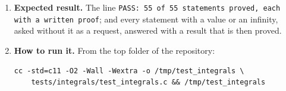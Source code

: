 \documentclass[11pt,a4paper]{article}
\begin{document}
\begin{enumerate}
\item \textbf{Expected result.} The line \texttt{PASS: 55 of 55 statements proved, each with a written proof}; and every statement with a value or an infinity, asked without it as a request, answered with a result that is then proved.

\item \textbf{How to run it.} From the top folder of the repository:
\begin{verbatim}
cc -std=c11 -O2 -Wall -Wextra -o /tmp/test_integrals \
    tests/integrals/test_integrals.c && /tmp/test_integrals
\end{verbatim}
\end{enumerate}
\end{document}
